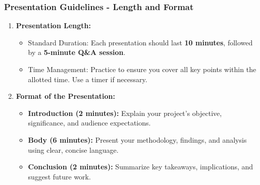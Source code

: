 \documentclass[aspectratio=169]{beamer}
\begin{document}
\begin{frame}[fragile]
    \frametitle{Presentation Guidelines - Length and Format}
    \begin{enumerate}
        \item \textbf{Presentation Length:}
        \begin{itemize}
            \item Standard Duration: Each presentation should last \textbf{10 minutes}, followed by a \textbf{5-minute Q\&A session}.
            \item Time Management: Practice to ensure you cover all key points within the allotted time. Use a timer if necessary.
        \end{itemize}
        
        \item \textbf{Format of the Presentation:}
        \begin{itemize}
            \item \textbf{Introduction (2 minutes):} Explain your project’s objective, significance, and audience expectations.
            \item \textbf{Body (6 minutes):} Present your methodology, findings, and analysis using clear, concise language.
            \item \textbf{Conclusion (2 minutes):} Summarize key takeaways, implications, and suggest future work.
        \end{itemize}
    \end{enumerate}
\end{frame}
\end{document}
